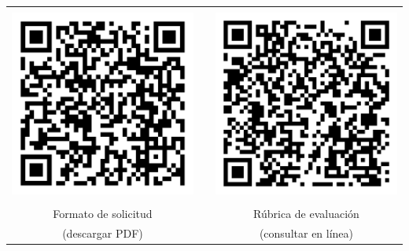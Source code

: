 \documentclass[a0]{sciposter}
\begin{document}
\quad

\begin{center}
\begin{tabular}{ccc}
\quad & & \quad \\
  
\includegraphics[width=80mm]{solicitud.png}
& &
\includegraphics[width=80mm]{rubrica.png} \\

\quad & & \quad \\
  
 Formato de solicitud & \quad\quad\quad & Rúbrica de evaluación \\
(descargar PDF) & & (consultar en línea) 


\end{tabular}
\end{center}
\end{document}
